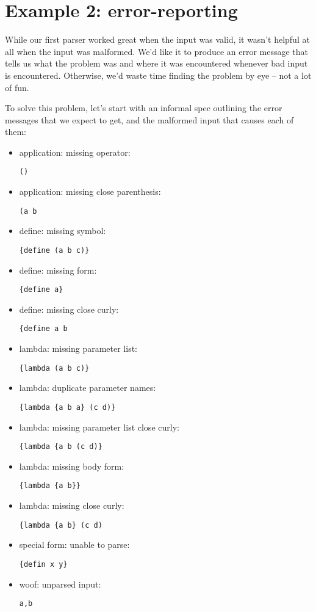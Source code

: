 \documentclass{tmr}
\begin{document}
\section{Example 2: error-reporting}
While our first parser worked great when the input was valid, it wasn't helpful
at all when the input was malformed.  We'd like it to produce an error message
that tells us what the problem was and where it was encountered whenever bad
input is encountered.  Otherwise, we'd waste time finding the problem by eye 
-- not a lot of fun.  

To solve this problem, let's start with an informal spec outlining the error
messages that we expect to get, and the malformed input that causes each of them: 
\begin{itemize}
\item application: missing operator:  \begin{verbatim}()\end{verbatim}
\item application: missing close parenthesis:  \begin{verbatim}(a b\end{verbatim}
\item define: missing symbol:  \begin{verbatim}{define (a b c)}\end{verbatim}
\item define: missing form:  \begin{verbatim}{define a}\end{verbatim}
\item define: missing close curly:  \begin{verbatim}{define a b\end{verbatim}
\item lambda: missing parameter list:  \begin{verbatim}{lambda (a b c)}\end{verbatim}
\item lambda: duplicate parameter names:  \begin{verbatim}{lambda {a b a} (c d)}\end{verbatim}
\item lambda: missing parameter list close curly:  \begin{verbatim}{lambda {a b (c d)}\end{verbatim}
\item lambda: missing body form:  \begin{verbatim}{lambda {a b}}\end{verbatim}
\item lambda: missing close curly:  \begin{verbatim}{lambda {a b} (c d)\end{verbatim}
\item special form: unable to parse:  \begin{verbatim}{defin x y}\end{verbatim}
\item woof: unparsed input:  \begin{verbatim}a,b\end{verbatim}
\end{itemize}
\end{document}

